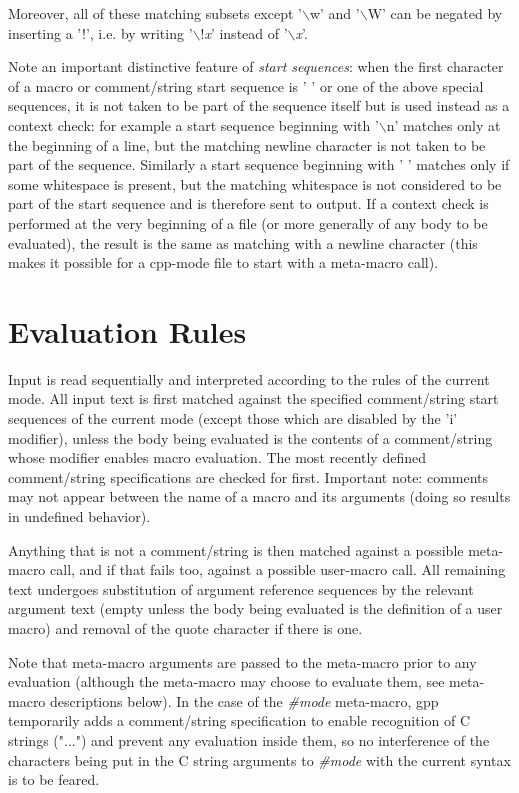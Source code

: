Moreover, all of these matching subsets except '$\backslash$w' and '$\backslash$W' can be 
negated by inserting a '!', i.e. by writing '$\backslash$!{\it x}' instead of '$\backslash${\it x}'.


Note an important distinctive feature of {\it start sequences}: when the
first character of a macro or comment/string start sequence is ' ' or one 
of the above special sequences, it is not taken to be part of the sequence 
itself but is used instead as a context check: for example a start sequence 
beginning with '$\backslash$n' matches only at the beginning of a line, but the 
matching newline character is not taken to be part of the sequence. 
Similarly a start sequence beginning with ' ' matches only if some
whitespace is present, but the matching whitespace is not considered to
be part of the start sequence and is therefore sent to output. If a context
check is performed at the very beginning of a file (or more generally of
any body to be evaluated), the result is the same as matching with a newline 
character (this makes it possible for a cpp-mode file to start with a
meta-macro call).
\section{Evaluation Rules}


Input is read sequentially and interpreted according to the rules of the
current mode. All input text is first matched against the specified
comment/string start sequences of the current mode (except those which
are disabled by the 'i' modifier), unless the body being evaluated is
the contents of a comment/string whose modifier enables macro evaluation. 
The most recently defined comment/string specifications are checked for 
first. Important note: comments may not appear between the name of a macro
and its arguments (doing so results in undefined behavior).


Anything that is not a comment/string is then matched against a possible
meta-macro call, and if that fails too, against a possible user-macro
call. All remaining text undergoes substitution of argument reference
sequences by the relevant argument text (empty unless the body being
evaluated is the definition of a user macro) and removal of the quote 
character if there is one.


Note that meta-macro arguments are passed to the meta-macro prior to
any evaluation (although the meta-macro may choose to evaluate them,
see meta-macro descriptions below). In the case of the {\it \#mode}
meta-macro, gpp temporarily adds a comment/string specification to
enable recognition of C strings ("...") and prevent any evaluation
inside them, so no interference of the characters being put in the C
string arguments to {\it \#mode} with the current syntax is to be feared.


